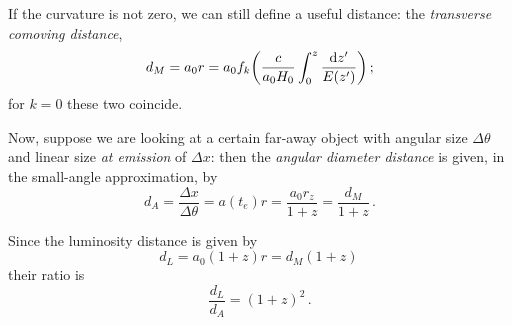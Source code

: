 \documentclass[main.tex]{subfiles}
\begin{document}
If the curvature is not zero, we can still define a useful distance: the \emph{transverse comoving distance}, 
%
\begin{align}
d_M = a_0 r = a_0 f_k \qty(\frac{c}{a_0 H_0 } \int_0^z \frac{\dd{z'}   }{E(z')})
\,;
\end{align}
%
for \(k=0\) these two coincide.



Now,  suppose we are looking at a certain far-away object with angular size \(\Delta \theta \) and linear size \emph{at emission} of \(\Delta x\): then the \emph{angular diameter distance} is given, in the small-angle approximation, by
%
\begin{equation}
d_A = \frac{ \Delta x}{\Delta \theta } = a(t_e) r
= \frac{a_0 r_z}{1+z} = \frac{d_M}{1+z}
\,.
\end{equation}

Since the luminosity distance is given by 
%
\begin{equation}
 d_L = a_0 (1+z) r = d_M (1+z)
\,
\end{equation}
%
their ratio is  
%
\begin{equation}
  \frac{d_L}{d_A} = (1+z)^2
\,.
\end{equation}


\end{document}

